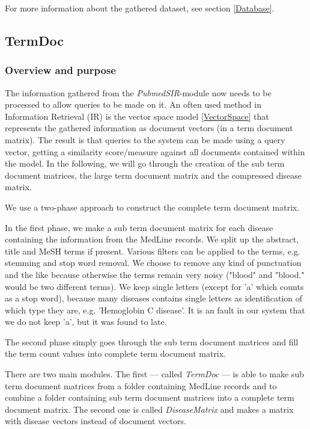 For more information about the gathered dataset, see section \ref{Database}.

\subsection{TermDoc\label{TermDoc}}

\subsubsection{Overview and purpose}
The information gathered from the \textit{PubmedSIR}-module now needs to be
processed to allow queries to be made on it. An often used method in
Information Retrieval (IR) is the vector space model \ref{VectorSpace}
that represents the gathered information as document vectors (in a
term document matrix). The result is that queries to the system can be
made using a query vector, getting a similarity score/measure against
all documents contained within the model. In the following, we will go
through the creation of the sub term document matrices, the large term
document matrix and the compressed disease matrix.

We use a two-phase approach to construct the complete term document
matrix.

In the first phase, we make a sub term document matrix for each
disease containing the information from the MedLine records. We split
up the abstract, title and MeSH terms if present. Various filters can
be applied to the terms, e.g. stemming and stop word removal. We
choose to remove any kind of punctuation and the like because
otherwise the terms remain very noisy ("blood" and "blood." would be
two different terms). We keep single letters (except for 'a' which
counts as a stop word), because many diseases contains single letters
as identification of which type they are, e.g. 'Hemoglobin C
disease'. It is an fault in our system that we do not keep 'a', but it
was found to late.

The second phase simply goes through the sub term document matrices
and fill the term count values into complete term document matrix.

There are two main modules. The first --- called \textit{TermDoc} --- is
able to make sub term document matrices from a folder containing
MedLine records and to combine a folder containing sub term document
matrices into a complete term document matrix. The second one is
called \textit{DiseaseMatrix} and makes a matrix with disease vectors
instead of document vectors.

